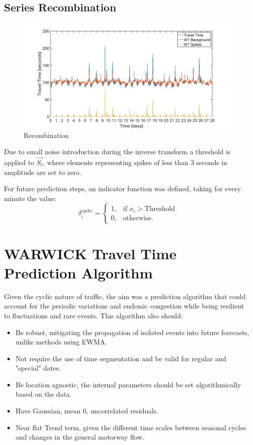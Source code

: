 \documentclass[letterpaper, 10 pt, conference]{ieeeconf}  %
\begin{document}
\subsection{Series Recombination}
\begin{figure}[htbp]
	\centerline{\includegraphics[width=\linewidth]{./images/Splitting.png}}
	\caption{Recombination}
	\label{fig:splitting}
\end{figure}

Due to small noise introduction during the inverse transform a threshold is applied to $\vec{S_t}$, where elements representing spikes of less than 3 seconds in amplitude are set to zero.

For future prediction steps, an indicator function was defined, taking for every minute the value:
\begin{equation}
    \delta_i^{spike}=
    \begin{cases}
      1, & \text{if } x_i > \text{Threshold}\\
      0, & \text{otherwise.}
    \end{cases}
    \label{delta}
  \end{equation}
  


\section{WARWICK Travel Time Prediction Algorithm} \label{algorithm}
Given the cyclic nature of traffic, the aim was a prediction algorithm that could account for the periodic variations and endemic congestion while being resilient to fluctuations and rare events. This algorithm also should:
\begin{itemize}
	\item Be robust, mitigating the propagation of isolated events into future forecasts, unlike methods using EWMA.
	\item Not require the use of time segmentation and be valid for regular and "special" dates.
	\item Be location agnostic, the internal parameters should be set algorithmically based on the data.
	\item Have Gaussian, mean 0, uncorrelated residuals.
	\item Near flat Trend term, given the different time scales between seasonal cycles and changes in the general motorway flow.
\end{itemize}
\end{document}
